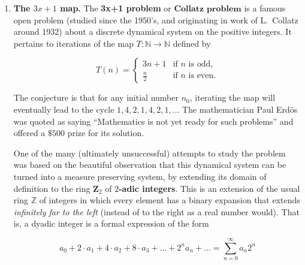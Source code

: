 \documentclass[11pt]{report}
\newcommand{\Z}{\mathbb{Z}}
\newcommand{\N}{\mathbb{N}}
\theoremstyle{plain}
\theoremstyle{definition}
\begin{document}
\begin{enumerate}[label=\arabic*.]
The computer scientist Richard Brent noticed in 1976 that this algorithm can also be reformulated in terms of a dynamical system. Similarly to the case of the Euclidean algorithm, the theoretical analysis of the running time of the binary GCD algorithm leads to highly nontrivial questions (most of them still open) about the behavior of this dynamical system. In particular, this system has an invariant measure that is mutually absolutely continuous with respect to Lebesgue measure, and is analogous to the Gauss measure, but no good formula for it is known. See Section~4.5.3 in Knuth's book mentioned above for more details.
\item \textbf{The $3x+1$ map.} The \textbf{3x+1 problem} or $\textbf{Collatz problem}$ is a famous open problem (studied since the 1950's, and originating in work of L.~Collatz around 1932) about a discrete dynamical system on the positive integers. It pertains to iterations of the map $T:\N\to\N$ defined by

\[
T(n) = \begin{cases} 3n+1 & \textrm{if $n$ is odd}, \\ \frac{\displaystyle n}{\displaystyle 2} & \textrm{if $n$ is even}.
\end{cases}
\]

The conjecture is that for any initial number $n_0$, iterating the map will eventually lead to the cycle $1,4,2,1,4,2,1,\ldots$ The mathematician Paul Erdös was quoted as saying ``Mathematics is not yet ready for such problems'' and offered a \(\$500\) prize for its solution.

One of the many (ultimately unsuccessful) attempts to study the problem was based on the beautiful observation that this dynamical system can be turned into a measure preserving system, by extending its domain of definition to the ring $\textbf{Z}_2$ of \textbf{$2$-adic integers}. This is an extension of the usual ring $\Z$ of integers in which every element has a binary expansion that extends \emph{infinitely far to the left} (instead of to the right as a real number would). That is, a dyadic integer is a formal expression of the form

\[
a_0 + 2\cdot a_1 + 4\cdot a_2 + 8\cdot a_3 + \ldots + 2^n a_n + \ldots = \sum_{n=0}^\infty a_n 2^n
\]


\end{enumerate}
\end{document}
